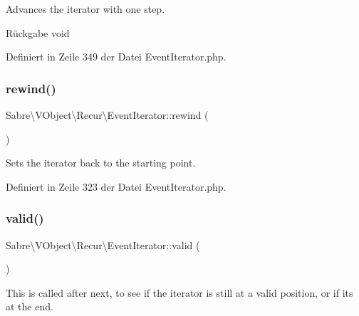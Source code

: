 Advances the iterator with one step.

\begin{DoxyReturn}{Rückgabe}
void 
\end{DoxyReturn}


Definiert in Zeile 349 der Datei Event\+Iterator.\+php.

\mbox{\label{class_sabre_1_1_v_object_1_1_recur_1_1_event_iterator_a6bf965f95f1b9ed5d6f8f5784ac74676}} 
\subsubsection{\texorpdfstring{rewind()}{rewind()}}
{\footnotesize\ttfamily Sabre\textbackslash{}\+V\+Object\textbackslash{}\+Recur\textbackslash{}\+Event\+Iterator\+::rewind (\begin{DoxyParamCaption}{ }\end{DoxyParamCaption})}

Sets the iterator back to the starting point. 

Definiert in Zeile 323 der Datei Event\+Iterator.\+php.

\mbox{\label{class_sabre_1_1_v_object_1_1_recur_1_1_event_iterator_a65fb707d2e909a2011f499b1435baceb}} 
\subsubsection{\texorpdfstring{valid()}{valid()}}
{\footnotesize\ttfamily Sabre\textbackslash{}\+V\+Object\textbackslash{}\+Recur\textbackslash{}\+Event\+Iterator\+::valid (\begin{DoxyParamCaption}{ }\end{DoxyParamCaption})}

This is called after next, to see if the iterator is still at a valid position, or if it\textquotesingle{}s at the end.

